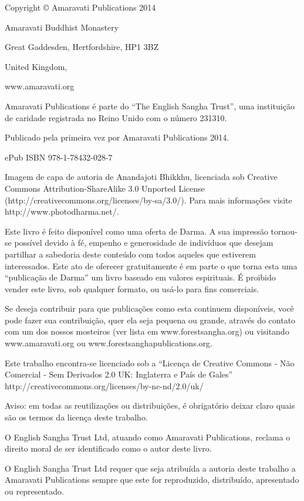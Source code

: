 
Copyright © Amaravati Publications 2014

Amaravati Buddhist Monastery

Great Gaddesden, Hertfordshire, HP1 3BZ

United Kingdom,

www.amaravati.org

Amaravati Publications é parte do “The English Sangha Trust”, uma
instituição de caridade registrada no Reino Unido com o número 231310.

Publicado pela primeira vez por Amaravati Publications 2014.

ePub ISBN 978-1-78432-028-7

Imagem de capa de autoria de Anandajoti Bhikkhu, licenciada sob Creative
Commons Attribution-ShareAlike 3.0 Unported License
(http://creativecommons.org/licenses/by-sa/3.0/). Para mais informações
visite http://www.photodharma.net/. 

Este livro é feito disponível como uma oferta de Darma. A sua impressão
tornou-se possível devido à fé, empenho e generosidade de indivíduos
que desejam partilhar a sabedoria deste conteúdo com todos aqueles que
estiverem interessados. Este ato de oferecer gratuitamente é em parte o
que torna esta uma “publicação de Darma” um livro baseado em valores
espirituais. É proibido vender este livro, sob qualquer formato, ou
usá-lo para fins comerciais.

Se deseja contribuir para que publicações como esta continuem
disponíveis, você pode fazer sua contribuição, quer ela seja pequena ou
grande, através do contato com um dos nossos mosteiros (ver lista em
www.forestsangha.org) ou visitando www.amaravati.org ou
www.forestsanghapublications.org.

Este trabalho encontra-se licenciado sob a “Licença de Creative Commons
- Não Comercial - Sem Derivados 2.0 UK: Inglaterra e País de Gales”
http://creativecommons.org/licenses/by-nc-nd/2.0/uk/

Aviso: em todas as reutilizações ou distribuições, é obrigatório deixar
claro quais são os termos da licença deste trabalho.

O English Sangha Trust Ltd, atuando como Amaravati Publications, reclama
o direito moral de ser identificado como o autor deste livro.

O English Sangha Trust Ltd requer que seja atribuída a autoria deste
trabalho a Amaravati Publications sempre que este for reproduzido,
distribuído, apresentado ou representado.

